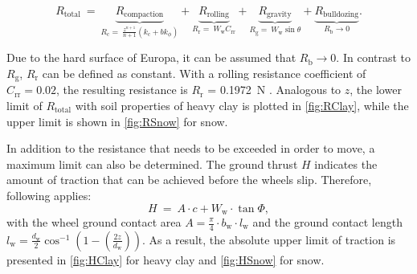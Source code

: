 \begin{equation}
 	R_{\text{total}} \:  = \: 
 	\underbrace{R_\text{compaction}}_{R_\text{c} = \: \frac{z^{n+1}}{n+1} \left( k_\text{c} + b  k_\phi \right)} + 
 	\underbrace{R_\text{rolling}}_{R_\text{r} = \: W_\text{w}  C_\text{rr}} +  
 	\underbrace{R_\text{gravity}}_{R_\text{g} = \: W_\text{w}  \sin \theta} +
 	\underbrace{R_\text{bulldozing}}_{R_\text{b} \rightarrow 0}. 	
 	\label{eq:Resistance}
 \end{equation} 

Due to the hard surface of Europa, it can be assumed that \( R_\text{b} \rightarrow 0\). In contrast to \( R_\text{g} \), \( R_\text{r}\) can be defined as constant. With a rolling resistance coefficient of \( C_\text{rr} = 0.02\), the resulting resistance is \( R_\text{r}\) = 0.1972~N \cite{rolling coefficient}. Analogous to \(z\), the lower limit of \(R_{\text{total}}\) with soil properties of heavy clay is plotted in \autoref{fig:RClay}, while the upper limit is shown in \autoref{fig:RSnow} for snow.

In addition to the resistance that needs to be exceeded in order to move, a maximum limit can also be determined. The ground thrust \(H\) indicates the amount of traction that can be achieved before the wheels slip.  Therefore, following applies:
\begin{equation}
	H \:  = \: A \cdot c + W_\text{w} \cdot \tan \Phi , 
	\label{eq:}
\end{equation}
 with the wheel ground contact area \(A = \frac{\pi}{4} \cdot b_\text{w} \cdot l_\text{w}\) and the ground contact length \(l_\text{w}=\frac{d_\text{w}}{2}\cos^{-1}\left(1 - \left( \frac{2z}{d_\text{w}} \right) \right)\). As a result, the absolute upper limit of traction is presented in \autoref{fig:HClay} for heavy clay and \autoref{fig:HSnow} for snow. 
 

